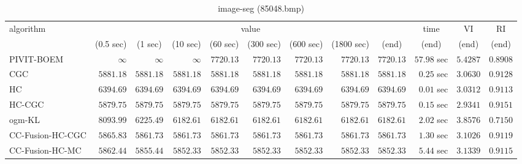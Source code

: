 \begin{table}[H]
\scriptsize
\centering
\caption{image-seg (85048.bmp)}
\label{tab:anytimetable-image-seg-85048.bmp}
\begin{tabular}{lrrrrrrrrrrr}
\toprule
           algorithm &                                   \multicolumn{8}{c}{value} & \multicolumn{1}{c}{time}    & \multicolumn{1}{c}{VI}  & \multicolumn{1}{c}{RI} \\  
\cmidrule(lr){2-9}\cmidrule(lr){10-10} \cmidrule(lr){11-11} \cmidrule(lr){12-12}   
                     & \multicolumn{1}{c}{(0.5 sec)} & \multicolumn{1}{c}{(1 sec)} & \multicolumn{1}{c}{(10 sec)} & \multicolumn{1}{c}{(60 sec)} & \multicolumn{1}{c}{(300 sec)} & \multicolumn{1}{c}{(600 sec)} & \multicolumn{1}{c}{(1800 sec)} & \multicolumn{1}{c}{(end)} & \multicolumn{1}{c}{(end)}    & \multicolumn{1}{c}{(end)}   & \multicolumn{1}{c}{(end)}  \\ \midrule 
          PIVIT-BOEM & $\infty$ & $\infty$ & $\infty$ & $      7720.13$ & $      7720.13$ & $      7720.13$ & $      7720.13$ & $      7720.13$ & $        57.98$ sec    & $       5.4287$  & $       0.8908$ \\ 
                 CGC & $      5881.18$ & $      5881.18$ & $      5881.18$ & $      5881.18$ & $      5881.18$ & $      5881.18$ & $      5881.18$ & $      5881.18$ & $         0.25$ sec    & $       3.0630$  & $       0.9128$ \\ 
                  HC & $      6394.69$ & $      6394.69$ & $      6394.69$ & $      6394.69$ & $      6394.69$ & $      6394.69$ & $      6394.69$ & $      6394.69$ & $         0.01$ sec    & $       3.0312$  & $       0.9113$ \\ 
              HC-CGC & $      5879.75$ & $      5879.75$ & $      5879.75$ & $      5879.75$ & $      5879.75$ & $      5879.75$ & $      5879.75$ & $      5879.75$ & $         0.15$ sec    & $       2.9341$  & $       0.9151$ \\ 
              ogm-KL & $      8093.99$ & $      6225.49$ & $      6182.61$ & $      6182.61$ & $      6182.61$ & $      6182.61$ & $      6182.61$ & $      6182.61$ & $         2.02$ sec    & $       3.8576$  & $       0.7150$ \\ 
    CC-Fusion-HC-CGC & $      5865.83$ & $      5861.73$ & $      5861.73$ & $      5861.73$ & $      5861.73$ & $      5861.73$ & $      5861.73$ & $      5861.73$ & $         1.30$ sec    & $       3.1026$  & $       0.9119$ \\ 
     CC-Fusion-HC-MC & $      5862.44$ & $      5855.44$ & $      5852.33$ & $      5852.33$ & $      5852.33$ & $      5852.33$ & $      5852.33$ & $      5852.33$ & $         5.44$ sec    & $       3.1339$  & $       0.9115$ \\ 

\end{tabular}
\end{table}
